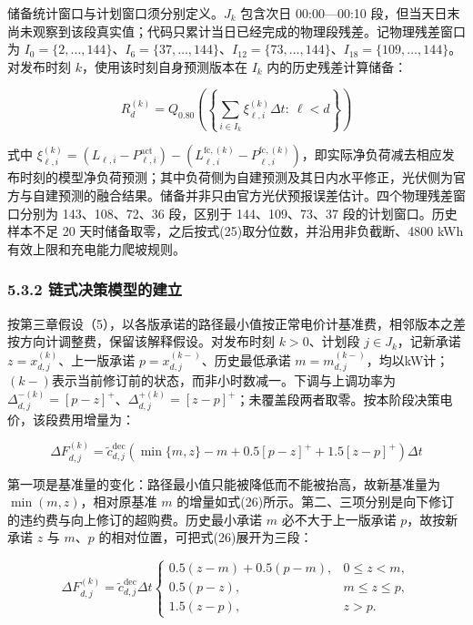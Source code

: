 \documentclass[12pt,a4paper]{ctexart}
\begin{document}
储备统计窗口与计划窗口须分别定义。$J_k$ 包含次日 00:00—00:10 段，但当天日末尚未观察到该段真实值；代码只累计当日已经完成的物理段残差。记物理残差窗口为 $I_0=\{2,\ldots,144\}$、$I_6=\{37,\ldots,144\}$、$I_{12}=\{73,\ldots,144\}$、$I_{18}=\{109,\ldots,144\}$。对发布时刻 $k$，使用该时刻自身预测版本在 $I_k$ 内的历史残差计算储备：

\begin{equation}
R_d^{(k)}=Q_{0.80}\left(\left\{\sum_{i\in I_k}\xi_{\ell,i}^{(k)}\Delta t:\ \ell<d\right\}\right)
\end{equation}

式中 $\xi_{\ell,i}^{(k)}=(L_{\ell,i}-P^{\mathrm{act}}_{\ell,i})-(L^{\mathrm{fc},(k)}_{\ell,i}-P^{\mathrm{fc},(k)}_{\ell,i})$，即实际净负荷减去相应发布时刻的模型净负荷预测；其中负荷侧为自建预测及其日内水平修正，光伏侧为官方与自建预测的融合结果。储备并非只由官方光伏预报误差估计。四个物理残差窗口分别为 143、108、72、36 段，区别于 144、109、73、37 段的计划窗口。历史样本不足 20 天时储备取零，之后按式(25)取分位数，并沿用非负截断、4800 kWh 有效上限和充电能力爬坡规则。

\subsubsection*{5.3.2 链式决策模型的建立}

按第三章假设（5），以各版承诺的路径最小值按正常电价计基准费，相邻版本之差按方向计调整费，保留该解释假设。对发布时刻 $k>0$、计划段 $j\in J_k$，记新承诺 $z=x_{d,j}^{(k)}$、上一版承诺 $p=x_{d,j}^{(k-)}$、历史最低承诺 $m=m_{d,j}^{(k-)}$，均以kW计；$(k-)$表示当前修订前的状态，而非小时数减一。下调与上调功率为 $\Delta_{d,j}^{-(k)}=[p-z]^+$、$\Delta_{d,j}^{+(k)}=[z-p]^+$；未覆盖段两者取零。按本阶段决策电价，该段费用增量为：

\begin{equation}
\Delta F_{d,j}^{(k)}=\widetilde c_{d,j}^{\mathrm{dec}}\left(\min\{m,z\}-m+0.5[p-z]^++1.5[z-p]^+\right)\Delta t
\end{equation}

第一项是基准量的变化：路径最小值只能被降低而不能被抬高，故新基准量为 $\min(m,z)$，相对原基准 $m$ 的增量如式(26)所示。第二、三项分别是向下修订的违约费与向上修订的超购费。历史最小承诺 $m$ 必不大于上一版承诺 $p$，故按新承诺 $z$ 与 $m$、$p$ 的相对位置，可把式(26)展开为三段：

\begin{equation}
\Delta F_{d,j}^{(k)}=\widetilde c_{d,j}^{\mathrm{dec}}\Delta t\begin{cases}0.5(z-m)+0.5(p-m),&0\le z<m,\\0.5(p-z),&m\le z\le p,\\1.5(z-p),&z>p.\end{cases}
\end{equation}
\end{document}

